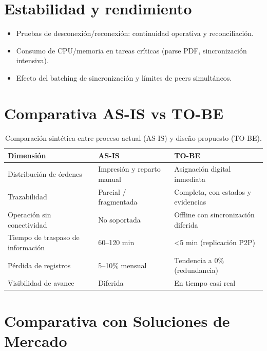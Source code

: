 \documentclass[10pt,a4paper]{report}
\begin{document}
\section*{Estabilidad y rendimiento}
\begin{itemize}
    \item Pruebas de desconexi\'on/reconexi\'on: continuidad operativa y reconciliaci\'on.
    \item Consumo de CPU/memoria en tareas cr\'iticas (parse PDF, sincronizaci\'on intensiva).
    \item Efecto del batching de sincronizaci\'on y l\'imites de peers simult\'aneos.
\end{itemize}

\section*{Comparativa AS-IS vs TO-BE}
\begin{table}[H]
    \centering
    \begin{tabular}{p{5cm} p{5.5cm} p{5.5cm}}
        \hline
        \textbf{Dimensi\'on} & \textbf{AS-IS} & \textbf{TO-BE} \\
        \hline
        Distribuci\'on de órdenes & Impresi\'on y reparto manual & Asignaci\'on digital inmedíata \\
        Trazabilidad & Parcial / fragmentada & Completa, con estados y evidencias \\
        Operaci\'on sin conectividad & No soportada & Offline con sincronizaci\'on diferida \\
        Tiempo de traspaso de informaci\'on & 60--120 min & \textless 5 min (replicaci\'on P2P) \\
        P\'erdida de registros & 5--10\% mensual & Tendencia a 0\% (redundancia) \\
        Visibilidad de avance & Diferida & En tiempo casi real \\
        \hline
    \end{tabular}
    \caption{Comparaci\'on sint\'etica entre proceso actual (AS-IS) y dise\~no propuesto (TO-BE).}
    \label{tab:comparativa-asis-tobe}
\end{table}

\section*{Comparativa con Soluciones de Mercado}
\end{document}
